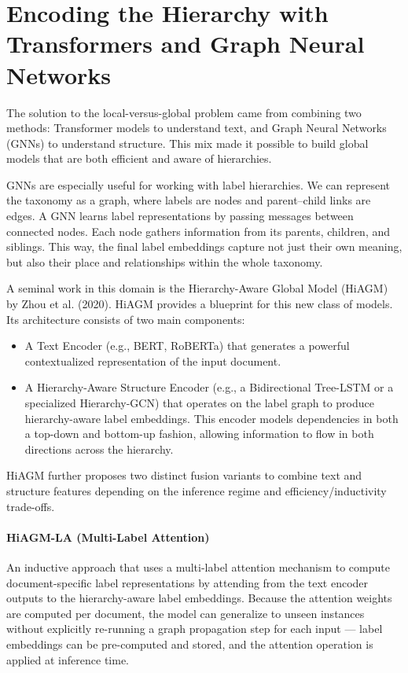 \section{Encoding the Hierarchy with Transformers and Graph Neural Networks}

The solution to the local-versus-global problem came from combining two methods: Transformer models to understand text, and Graph Neural Networks (GNNs) to understand structure. This mix made it possible to build global models that are both efficient and aware of hierarchies. \cite{wang2024graphneuralnetworkstext, zhou-etal-2020-hierarchy}

GNNs are especially useful for working with label hierarchies. \cite{li2021heterogeneous} We can represent the taxonomy as a graph, where labels are nodes and parent–child links are edges. A GNN learns label representations by passing messages between connected nodes. Each node gathers information from its parents, children, and siblings. This way, the final label embeddings capture not just their own meaning, but also their place and relationships within the whole taxonomy.

A seminal work in this domain is the Hierarchy-Aware Global Model (HiAGM) by Zhou et al. (2020). HiAGM provides a blueprint for this new class of models. Its architecture consists of two main components:~\cite{zhou-etal-2020-hierarchy}

\begin{itemize}
	\item A Text Encoder (e.g., BERT, RoBERTa) that generates a powerful contextualized representation of the input document.
	\item A Hierarchy-Aware Structure Encoder (e.g., a Bidirectional Tree-LSTM or a specialized Hierarchy-GCN) that operates on the label graph to produce hierarchy-aware label embeddings. This encoder models dependencies in both a top-down and bottom-up fashion, allowing information to flow in both directions across the hierarchy.
\end{itemize}

HiAGM further proposes two distinct fusion variants to combine text and structure features depending on the inference regime and efficiency/inductivity trade-offs.

\paragraph{HiAGM-LA (Multi-Label Attention)}
An inductive approach that uses a multi-label attention mechanism to compute document-specific label representations by attending from the text encoder outputs to the hierarchy-aware label embeddings. Because the attention weights are computed per document, the model can generalize to unseen instances without explicitly re-running a graph propagation step for each input — label embeddings can be pre-computed and stored, and the attention operation is applied at inference time.

